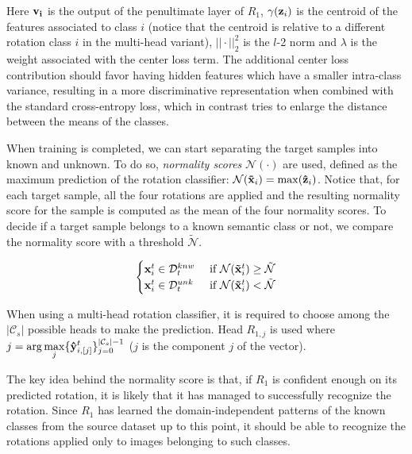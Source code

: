 \documentclass[10pt,twocolumn,letterpaper]{article}
\begin{document}
Here ${\bf v_i}$ is the output of the penultimate layer of $R_1$,
$\gamma({\bf z}_i)$ is the centroid of the features associated to class $i$
(notice that the centroid is relative to a different rotation class $i$ in the multi-head variant),
$||\cdot||_2^2$ is the $l$-2 norm and $\lambda$ is the weight associated with the center loss term.
The additional center loss contribution should favor having hidden features which have
a smaller intra-class variance, resulting in a more discriminative representation
when combined with the standard cross-entropy loss,
which in contrast tries to enlarge the distance between the means of the classes.

When training is completed, 
we can start separating the target samples into known and unknown.
To do so,
{\it normality scores} $\mathcal{N}(\cdot)$ are used,
defined as the maximum prediction of the rotation classifier:
$\mathcal{N}({\bf\tilde{x}}_i) = \max({\bf\hat{z}}_i)$.
Notice that, for each target sample, all the four rotations are applied and the resulting normality score for the sample
is computed as the mean of the four normality scores.
To decide if a target sample belongs to a known semantic class or not, we compare the normality score with a threshold $\tilde{\mathcal{N}}$.

\begin{equation}
  \begin{cases}
    {\bf x}_i^t \in \mathcal{D}_t^{knw} & \text{ if } \mathcal{N}({\bf\tilde x}_i^t) \geq \tilde{\mathcal{N}} \\
    {\bf x}_i^t \in \mathcal{D}_t^{unk} & \text{ if } \mathcal{N}({\bf\tilde x}_i^t) < \tilde{\mathcal{N}}
  \end{cases}
  \label{eq:sample_separation}
\end{equation}

When using a multi-head rotation classifier, 
it is required to choose among the $|\mathcal{C}_s|$ possible heads to make the prediction.
Head $R_{1,j}$ is used where $\displaystyle j = \arg\max_j \{{\bf\hat{y}}_{i, [j]}^t\}_{j=0}^{|\mathcal{C}_s|-1}$
($j$ is the component $j$ of the vector).

The key idea behind the normality score is that, if $R_1$ is confident enough on its predicted rotation,
it is likely that it has managed to successfully recognize the rotation.
Since $R_1$ has learned the domain-independent patterns of the known classes from the source dataset up to this point,
it should be able to recognize the rotations applied only to images belonging to such classes.
\end{document}
